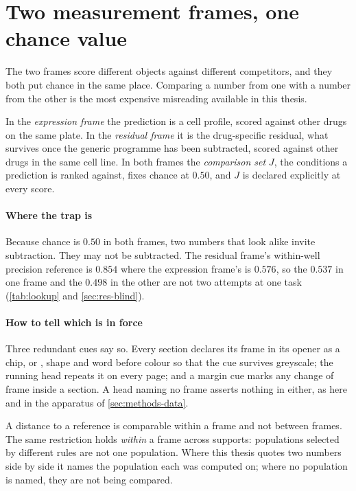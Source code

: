 \section*{Two measurement frames, one chance value}

\noindent
The two frames score different objects against different competitors, and they
both put chance in the same place. Comparing a number from one with a number
from the other is the most expensive misreading available in this
thesis.

In the \Eframe{} \emph{expression frame} the prediction is a cell profile,
scored against other drugs on the same plate. In the \Rframe{} \emph{residual
frame} it is the drug-specific residual, what survives once the generic
programme has been subtracted, scored against other drugs in the same cell
line. In both frames the \emph{comparison set} $J$, the conditions a prediction
is ranked against, fixes chance at $0.50$, and $J$ is declared explicitly at
every score.

\paragraph{Where the trap is} Because chance is $0.50$ in both frames, two
numbers that look alike invite subtraction. They may not be subtracted.
The residual frame's within-well precision reference is $0.854$
where the expression frame's is $0.576$, so the $0.537$ in one frame and the
$0.498$ in the other are not two attempts at one task
(\cref{tab:lookup} and \cref{sec:res-blind}).

\paragraph{How to tell which is in force} Three redundant cues say so. Every
section declares its frame in its opener as a chip, \Eframe{} or
\Rframe{}, shape and word before colour so that the cue survives greyscale; the
running head repeats it on every page; and a margin cue marks any change of
frame inside a section. A head naming no frame asserts nothing in either, as
here and in the apparatus of \cref{sec:methods-data}.

%
\begin{scopelimit}
A distance to a reference is comparable within a frame and not between frames.
The same restriction holds \emph{within} a frame across
supports: populations selected by different rules are not one population. Where
this thesis quotes two numbers side by side it names the population each was
computed on; where no population is named, they are not being compared.
\end{scopelimit}

